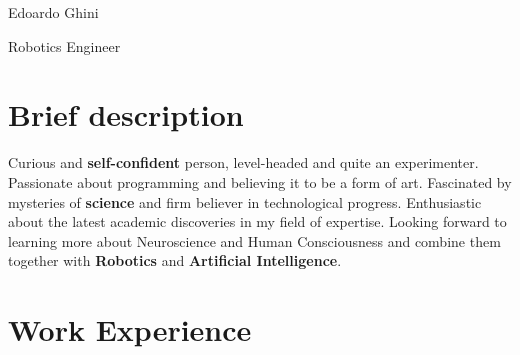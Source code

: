 \documentclass[
	10pt, %
]{../templates/FreemanCV}
\begin{document}
\begin{paracol}{2} %


\parbox[][0.09\textheight][c]{\linewidth}{ %
	\centering %
	
	{\sffamily\Huge Edoardo Ghini} %
	
	\medskip %
	
	{\Huge\textcolor{headings}{Robotics Engineer}}
	
	\vfill %
}

\section{Brief description}

  Curious and \textbf{self-confident} person, level-headed and quite an experimenter.
Passionate about programming and believing it to be a form of art.
  Fascinated by mysteries of \textbf{science} and firm believer in technological progress.
Enthusiastic about the latest academic discoveries in my field of expertise.
  Looking forward to learning more about Neuroscience and Human Consciousness and combine them together with \textbf{Robotics} and \textbf{Artificial Intelligence}.



\section{Work Experience}




\end{paracol}
\end{document}
